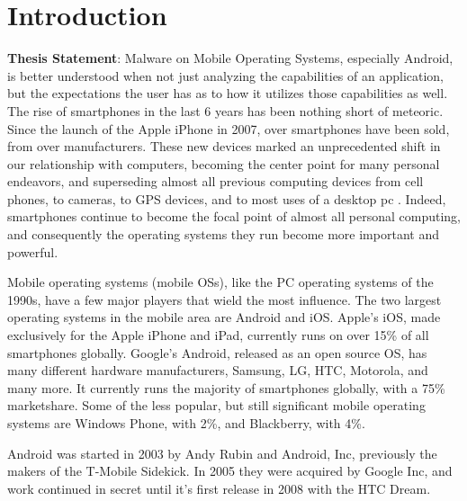 \chapter{Introduction}
\label{sec:intro}

\textbf{Thesis Statement}: Malware on Mobile Operating Systems, especially Android, is better understood when not just analyzing the capabilities of an application, but the expectations the user has as to how it utilizes those capabilities as well.\\


The rise of smartphones in the last 6 years has been nothing short of meteoric. Since the launch of the Apple iPhone in 2007, over  smartphones have been sold, from over  manufacturers. These new devices marked an unprecedented shift in our relationship with computers, becoming the center point for many personal endeavors, and superseding almost all previous computing devices from cell phones, to cameras, to GPS devices, and to most uses of a desktop pc . Indeed, smartphones continue to become the focal point of almost all personal computing, and consequently the operating systems they run become more important and powerful.

Mobile operating systems (mobile OSs), like the PC operating systems of the 1990s, have a few major players that wield the most influence. The two largest operating systems in the mobile area are Android and iOS. Apple’s iOS, made exclusively for the Apple iPhone and iPad, currently runs on over 15\% of all smartphones globally. Google’s Android, released as an open source OS, has many different hardware manufacturers, Samsung, LG, HTC, Motorola, and many more. It currently runs the majority of smartphones globally, with a 75\% marketshare. Some of the less popular, but still significant mobile operating systems are Windows Phone, with 2\%, and Blackberry, with 4\%. 

 Android was started in 2003 by Andy Rubin and Android, Inc, previously the makers of the T-Mobile Sidekick. In 2005 they were acquired by Google Inc, and work continued in secret until it’s first release in 2008 with the HTC Dream.

